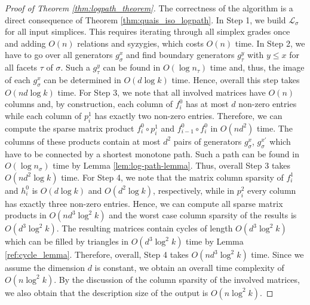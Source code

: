 \documentclass[a4paper,UKenglish,cleveref,nolineno,autoref]{socg-lipics-v2021}
\begin{document}
\begin{proof}[Proof of Theorem \ref{thm:logpath_theorem}]
The correctness of the algorithm is a direct consequence of Theorem \ref{thm:quais_iso_logpath}. In Step 1, we build $\mathcal{L}_\sigma$ for all input simplices. This requires iterating through all simplex grades once and adding $O(n)$ relations and syzygies, which costs $O(n)$ time. In Step 2, we have to go over all generators $g_\sigma^x$ and find boundary generators $g_\tau^y$ with $y\leq x$ for all facets $\tau$ of $\sigma$. Such a $g_\tau^y$ can be found in $O(\log n_\tau)$ time and, thus, the image of each $g_\sigma^x$ can be determined in $O(d\log k)$ time. Hence, overall this step takes $O(nd\log k)$ time. For Step 3, we note that all involved matrices have $O(n)$ columns and, by construction, each column of $f^0_i$ has at most $d$ non-zero entries while each column of $p^1_i$ has exactly two non-zero entries. Therefore, we can compute the sparse matrix product $f^0_i\circ p^1_i$ and $f^0_{i-1}\circ f^0_i$ in $O(nd^2)$ time. The columns of these products contain at most $d^2$ pairs of generators $g^x_\sigma$, $g_\sigma^{x'}$ which have to be connected by a shortest monotone path. Such a path can be found in $O(\log n_\sigma)$ time by Lemma \ref{lem:log-path-lemma}. Thus, overall Step 3 takes $O(nd^2\log k)$ time. For Step 4, we note that the matrix column sparsity of $f^1_i$ and $h^0_i$ is $O(d\log k)$ and $O(d^2\log k)$, respectively, while in $p^2_i$ every column has exactly three non-zero entries. Hence, we can compute all sparse matrix products in $O(nd^3\log^2 k)$ and the worst case column sparsity of the results is $O(d^3\log^2k)$. The resulting matrices contain cycles of length $O(d^3\log^2k)$ which can be filled by triangles in $O(d^3\log^2k)$ time by Lemma \ref{ref:cycle_lemma}. Therefore, overall, Step 4 takes $O(nd^3\log^2k)$ time. Since we assume the dimension $d$ is constant, we obtain an overall time complexity of $O(n\log^2 k)$. By the discussion of the column sparsity of the involved matrices, we also obtain that the description size of the output is $O(n\log^2 k)$.
\end{proof}
\end{document}
